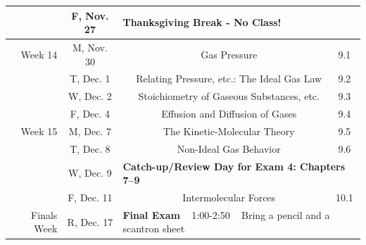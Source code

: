 \documentclass[12pt, letterpaper]{article}
\begin{document}
\begin{tabular}{rcccc}
	            & F, Nov. 27 & \multicolumn{3}{l}{\textbf{Thanksgiving Break - No Class!}}                                                                                      \\
	\midrule
	Week 14     & M, Nov. 30 &                                                                                           & Gas Pressure                               & 9.1     \\
	            & T, Dec. 1  &                                                                                           & Relating Pressure, etc.: The Ideal Gas Law & 9.2     \\
	            & W, Dec. 2  &                                                                                           & Stoichiometry of Gaseous Substances, etc.  & 9.3     \\
	            & F, Dec. 4  &                                                                                           & Effusion and Diffusion of Gases            & 9.4     \\
	\midrule
	Week 15     & M, Dec. 7  &                                                                                           & The Kinetic-Molecular Theory               & 9.5     \\
	            & T, Dec. 8  &                                                                                           & Non-Ideal Gas Behavior                     & 9.6     \\
	            & W, Dec. 9  & \multicolumn{3}{l}{\textbf{Catch-up/Review Day for Exam 4: Chapters 7--9}}                                                                       \\
	            & F, Dec. 11 &                                                                                           & Intermolecular Forces                      & 10.1    \\
	\midrule
	\midrule
	Finals Week & R, Dec. 17 & \multicolumn{3}{l}{\textbf{Final Exam} ~ 1:00-2:50 ~ Bring a pencil and a scantron sheet}                                                        \\
\end{tabular}
\end{document}
